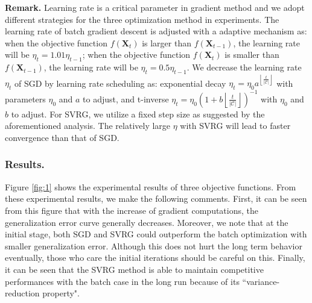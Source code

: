 \documentclass[letterpaper]{article}
\begin{document}
		\textbf{Remark. }Learning rate is a critical parameter in gradient method and we adopt different strategies for the three optimization method in experiments. The learning rate of batch gradient descent is adjusted with a adaptive mechanism as: when the objective function $f(\mathbf{X}_t)$ is larger than $f(\mathbf{X}_{t-1})$, the learning rate will be $\eta_t=1.01\eta_{t-1}$; when the objective function $f(\mathbf{X}_t)$ is smaller than $f(\mathbf{X}_{t-1})$, the learning rate will be $\eta_t=0.5\eta_{t-1}$. We decrease the learning rate $\eta_t$ of SGD by learning rate scheduling as: exponential decay $\eta_t = \eta_0 a^{\left \lfloor \frac{t}{|\mathcal{C}|} \right \rfloor}$ with parameters $\eta_0$ and $a$ to adjust, and t-inverse $\eta_t = \eta_0(1 + b\left \lfloor \frac{t}{|\mathcal{C}|} \right \rfloor)^{-1}$ with $\eta_0$ and $b$ to adjust. For SVRG, we utilize a fixed step size as suggested by the aforementioned analysis. The relatively large $\eta$ with SVRG will lead to faster convergence than that of SGD.

		\subsubsection{Results.}
		Figure \ref{fig:1} shows the experimental results of three objective functions. From these experimental results, we make the following comments. First, it can be seen from this figure that with the increase of gradient computations, the generalization error curve generally decreases. Moreover, we note that at the initial stage, both SGD and SVRG could outperform the batch optimization with smaller generalization error. Although this does not hurt the long term behavior eventually, those who care the initial iterations should be careful on this. Finally, it can be seen that the SVRG method is able to maintain competitive performances with the batch case in the long run because of its ``variance-reduction property". 

\end{document}
